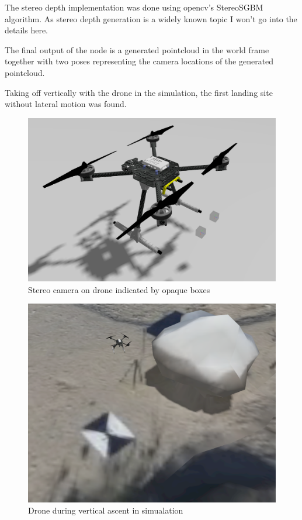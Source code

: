 The stereo depth implementation was done using opencv's StereoSGBM algorithm. As stereo depth generation is a widely known topic I won't go into the details here.

The final output of the node is a generated pointcloud in the world frame together with two poses representing the camera locations of the generated pointcloud.

Taking off vertically with the drone in the simulation, the first landing site without lateral motion was found.

\begin{figure}
    \centering
    \includegraphics[scale=0.32]{images/preparation/stereo/drone_with_stereo_cam.png}
    \caption{Stereo camera on drone indicated by opaque boxes}
\end{figure}

\begin{figure}
    \centering
    \includegraphics[scale=0.34]{images/preparation/stereo/ascent_sim.png}
    \caption{Drone during vertical ascent in simualation}
\end{figure}

